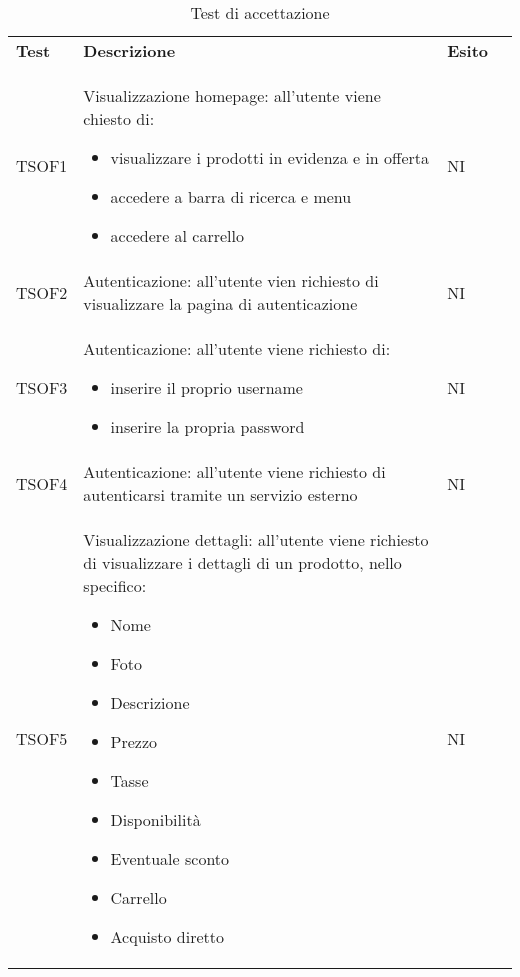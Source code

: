 \begin{center}
\centering
{}
\renewcommand{\arraystretch}{1.8}
\label{tab:TestAccettazione}
\begin{longtable}[!h]{p{50px} p{245px} p{75px} p{50px}}
\caption{Test di accettazione}                                                                                                                                                                       \\
\rowcolor{logo!70} \textbf{Test} & \textbf{Descrizione}                                                                                                                             & \textbf{Esito} \\
TSOF1                            & Visualizzazione homepage: all'utente viene chiesto di: \begin{itemize} \item visualizzare i prodotti in evidenza e in offerta \item accedere a barra di ricerca e menu \item accedere al carrello \end{itemize}                                                                 & NI             \\
TSOF2                            & Autenticazione: all'utente vien richiesto di visualizzare la pagina di autenticazione                                                            & NI             \\
TSOF3                            & Autenticazione: all'utente viene richiesto di: \begin{itemize} \item inserire il proprio username \item inserire la propria password \end{itemize}                                                                         & NI             \\
TSOF4                            & Autenticazione: all'utente viene richiesto di autenticarsi tramite un servizio esterno                                                           & NI             \\
TSOF5                            & Visualizzazione dettagli: all'utente viene richiesto di visualizzare i dettagli di un prodotto, nello specifico: \begin{itemize} \item Nome \item Foto \item Descrizione \item Prezzo\item Tasse \item Disponibilità \item Eventuale sconto \item Carrello \item Acquisto diretto \end{itemize}       & NI             \\

\end{longtable}
\end{center}
